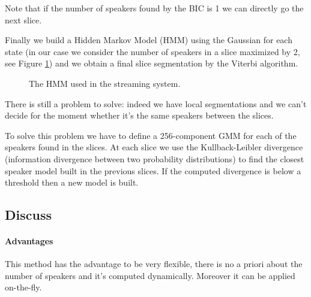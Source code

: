 \documentclass{techrep} %
\begin{document}
Note that if the number of speakers found by the BIC is 1 we can
directly go the next slice.

Finally we build a Hidden Markov Model (HMM) using the Gaussian for
each state (in our case we consider the number of speakers in a slice
maximized by 2, see Figure \ref{hmmstream}) and we obtain a final
slice segmentation by the Viterbi algorithm.

\begin{figure}[H]
  \begin{center}
  \end{center}
  \label{hmmstream}
  \caption{The HMM used in the streaming system.}
\end{figure}

There is still a problem to solve: indeed we have local segmentations
and we can't decide for the moment whether it's the same speakers between
the slices.

To solve this problem we have to define a 256-component GMM for each
of the speakers found in the slices.  At each slice we use the
Kullback-Leibler divergence (information divergence between two
probability distributions) to find the closest speaker model built in
the previous slices.  If the computed divergence is below a threshold
then a new model is built.

\subsection{Discuss}

\paragraph{Advantages} This method has the advantage to be very flexible, there is no a priori about the number of speakers and it's computed dynamically. Moreover it can be applied on-the-fly.
\end{document}
